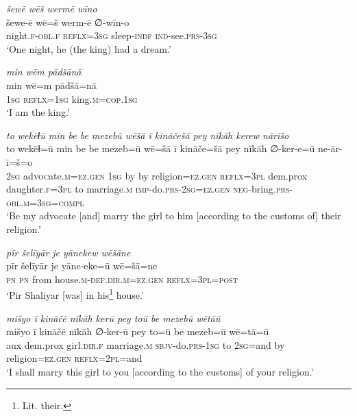 \ea \label{ŽP.153}
\textit{šewē wēš wermē wīno} \\ 
\gll šewe-ē wē=š werm-ē ∅-wīn-o \\ 
 night\textsc{.f}\textsc{-obl}\textsc{.f} \textsc{reflx}\textsc{=3sg} sleep\textsc{-indf} \textsc{ind-}see\textsc{.prs}\textsc{-3sg} \\ 
\glt `One night, he (the king) had a dream.'
\z 
 
\ea \label{ŽP.160}
\textit{min wēm pādšānā} \\ 
\gll min wē=m pādšā=nā \\ 
 \textsc{1sg} \textsc{reflx}\textsc{=\textsc{1sg}} king\textsc{.m}\textsc{=cop}\textsc{.\textsc{1sg}} \\ 
\glt `I am the king.'
\z 
 
\ea \label{ŽP.165}
\textit{to wekēɫū min be be mezebū wēšā ī kināčešā pey nīkāh kerew nārīšo} \\ 
\gll to wekēɫ=ū min be be mezeb=ū wē=šā ī kināče=šā pey nīkāh ∅-ker-e=ū ne-ār-ī=š=o \\ 
 \textsc{2sg} ad\textsc{voc}ate\textsc{.m}\textsc{\textsc{=ez.gen}} \textsc{1sg} by by religion\textsc{\textsc{=ez.gen}} \textsc{reflx}\textsc{=3pl} dem.prox daughter\textsc{.f}\textsc{=3pl} to marriage\textsc{.m} \textsc{imp-}do\textsc{.prs}-\textsc{2sg}\textsc{\textsc{=ez.gen}} \textsc{neg-}bring\textsc{.prs}\textsc{-obl}\textsc{.m}\textsc{=3sg}\textsc{=compl} \\ 
\glt `Be my advocate [and] marry the girl to him [according to the customs of] their religion.'
\z 
 
\ea \label{ŽP.188}
\textit{pīr šelīyār je yānekew wēšāne} \\ 
\gll pīr šelīyār je yāne-eke=ū wē=šā=ne \\ 
 \textsc{pn} \textsc{pn} from house\textsc{.m}\textsc{-def}\textsc{.dir}\textsc{.m}\textsc{\textsc{=ez.gen}} \textsc{reflx}\textsc{=3pl}\textsc{=\textsc{post}} \\ 
\glt `Pir Shaliyar [was] in his\footnote{Lit. their.} house.'
\z 
 
\ea \label{ŽP.207}
\textit{mišyo ī kināčē nīkāh kerū pey toū be mezebū wētāū} \\ 
\gll mišyo ī kināčē nīkāh ∅-ker-ū pey to=ū be mezeb=ū wē=tā=ū \\ 
 aux dem.prox girl\textsc{.dir}\textsc{.f} marriage\textsc{.m} \textsc{sbjv-}do\textsc{.prs}\textsc{-\textsc{1sg}} to \textsc{2sg}=and by religion\textsc{\textsc{=ez.gen}} \textsc{reflx}=\textsc{2pl}=and \\ 
\glt `I shall marry this girl to you [according to the customs] of your religion.'
\z 
 

